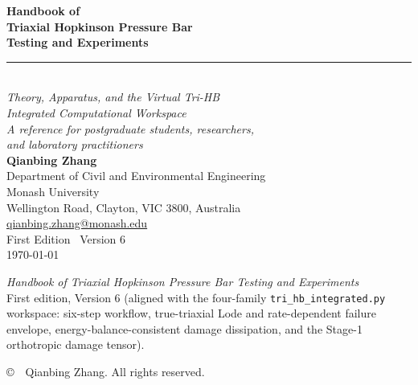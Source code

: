 \documentclass[11pt,a4paper,openany]{book}
\theoremstyle{handbook}
\begin{document}
\frontmatter

\thispagestyle{empty}
\begin{titlepage}
\centering
\vspace*{2cm}

{\Huge\bfseries\color{deepblue} Handbook of}\\[6pt]
{\Huge\bfseries\color{deepblue} Triaxial Hopkinson Pressure Bar}\\[6pt]
{\Huge\bfseries\color{deepblue} Testing and Experiments}\\[14pt]

{\color{rulegrey}\rule{0.7\textwidth}{0.6pt}}\\[14pt]

{\Large\itshape Theory, Apparatus, and the Virtual Tri-HB\\
Integrated Computational Workspace}\\[10pt]

{\Large\itshape A reference for postgraduate students, researchers,\\
and laboratory practitioners}\\[40pt]

{\Large\bfseries Qianbing Zhang}\\[6pt]
{\normalsize Department of Civil and Environmental Engineering}\\
{\normalsize Monash University}\\
{\normalsize Wellington Road, Clayton, VIC 3800, Australia}\\
{\normalsize\href{mailto:qianbing.zhang@monash.edu}{qianbing.zhang@monash.edu}}\\[60pt]

\vfill
{\large First Edition \textbullet\ Version 6}\\[6pt]
{\normalsize \today}
\end{titlepage}

\thispagestyle{empty}
\null\vfill
\noindent\textit{Handbook of Triaxial Hopkinson Pressure Bar Testing and Experiments}\\
First edition, Version 6 (aligned with the four-family
\texttt{tri\_hb\_integrated.py} workspace: six-step workflow, true-triaxial
Lode and rate-dependent failure envelope, energy-balance-consistent damage
dissipation, and the Stage-1 orthotropic damage tensor).

\bigskip
\noindent\copyright\ \the\year\ Qianbing Zhang. All rights reserved.
\end{document}

